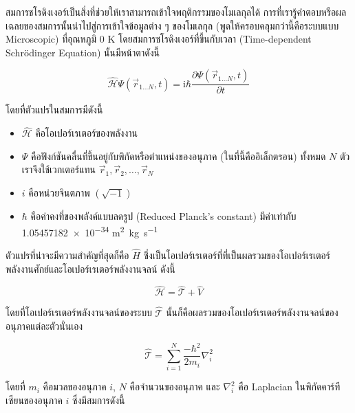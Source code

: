 สมการชโรดิงเงอร์เป็นสิ่งที่ช่วยให้เราสามารถเข้าใจพฤติกรรมของโมเลกุลได้ การที่เรารู้คำตอบหรือผลเฉลยของสมการนั้นนำไปสู่การเข้าใจข้อมูลต่าง ๆ
ของโมเลกุล (พูดให้ครอบคลุมกว่านี้คือระบบแบบ Microscopic) ที่อุณหภูมิ 0 K โดยสมการชโรดิงเงอร์ที่ขึ้นกับเวลา (Time-dependent 
Schr\"{o}dinger Equation) นั้นมีหน้าตาดังนี้

\begin{equation}
    \label{eq:time_dependent_schrodinger}
    \hat{\mathscr{H}} \Psi\left(\vec{r}_{1 \ldots N}, t\right) 
    = \mathrm{i} \hbar \frac{\partial \Psi\left(\vec{r}_{1 \ldots N}, t\right)}{\partial t}
\end{equation}

\noindent โดยที่ตัวแปรในสมการมีดังนี้
\begin{itemize}[topsep=0pt,noitemsep]
    \setlength\itemsep{1em}
    \item $\hat{\mathscr{H}}$ คือโอเปอร์เรเตอร์ของพลังงาน
    
    \item $\Psi$ คือฟังก์ชันคลื่นที่ขึ้นอยู่กับพิกัดหรือตำแหน่งของอนุภาค (ในที่นี้คืออิเล็กตรอน) ทั้งหมด $N$ ตัว เราจึงใช้เวกเตอร์แทน 
    $\vec{r}_{1}, \vec{r}_{2}, \dots, \vec{r}_{N}$ 
    
    \item $i$ คือหน่วยจินตภาพ $(\sqrt{-1})$
    
    \item $\hbar$ คือค่าคงที่ของพลังค์แบบลดรูป (Reduced Planck's constant) มีค่าเท่ากับ 
    \num{1.05457182e-34} \si{m^{2}.kg.s^{-1}}
\end{itemize}

ตัวแปรที่น่าจะมีความสำคัญที่สุดก็คือ $\hat{H}$ ซึ่งเป็นโอเปอร์เรเตอร์ที่ที่เป็นผลรวมของโอเปอร์เรเตอร์พลังงานศักย์และโอเปอร์เรเตอร์พลังงานจลน์ 
ดังนี้

\begin{equation}
    \label{eq:hamiltonian_operator}
    \hat{\mathscr{H}} = \hat{\mathscr{T}}+\hat{V}
\end{equation}

\noindent โดยที่โอเปอร์เรเตอร์พลังงานจลน์ของระบบ $\hat{\mathscr{T}}$ นั้นก็คือผลรวมของโอเปอร์เรเตอร์พลังงานจลน์ของอนุภาคแต่ละตัวนั่นเอง

\begin{equation}
    \label{eq:kinetic_operator}
    \hat{\mathscr{T}} = \sum_{i=1}^N \frac{-\hbar^2}{2 m_i} \nabla_i^2
\end{equation}

\noindent โดยที่ $m_i$ คือมวลของอนุภาค $i$, $N$ คือจำนวนของอนุภาค และ $\nabla_i^2$ คือ Laplacian ในพิกัดคาร์ทีเซียนของอนุภาค 
$i$ ซึ่งมีสมการดังนี้

